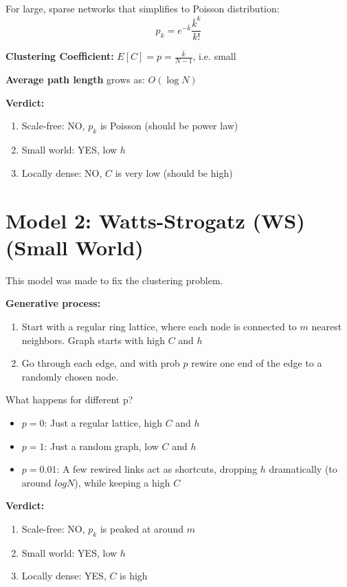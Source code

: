 For large, sparse networks that simplifies to Poisson distribution:
\[
p_k = e^{-\bar{k}} \frac{\bar{k}^k}{k!}
\]

\textbf{Clustering Coefficient:} $E[C] = p = \frac{\bar{k}}{N-1}$, i.e. small

\textbf{Average path length} grows as: $O(\log N)$

\textbf{Verdict:}
\begin{enumerate}
    \item Scale-free: NO, $p_k$ is Poisson (should be power law)
    \item Small world: YES, low $h$
    \item Locally dense: NO, $C$ is very low (should be high)
\end{enumerate}

\section*{Model 2: Watts-Strogatz (WS) (Small World)}

This model was made to fix the clustering problem. 

\textbf{Generative process:}
\begin{enumerate}
    \item Start with a regular ring lattice, where each node is connected to 
    $m$ nearest neighbors. Graph starts with high $C$ and $h$
    \item Go through each edge, and with prob $p$ rewire one end of the edge 
    to a randomly chosen node. 
\end{enumerate}

What happens for different p?
\begin{itemize}
    \item $p = 0$: Just a regular lattice, high $C$ and $h$
    \item $p = 1$: Just a random graph, low $C$ and $h$
    \item $p = 0.01$: A few rewired links act as shortcuts, dropping 
    $h$ dramatically (to around $log N$), while keeping a high $C$
\end{itemize}

\textbf{Verdict:}
\begin{enumerate}
    \item Scale-free: NO, $p_k$ is peaked at around $m$
    \item Small world: YES, low $h$
    \item Locally dense: YES, $C$ is high 
\end{enumerate}

